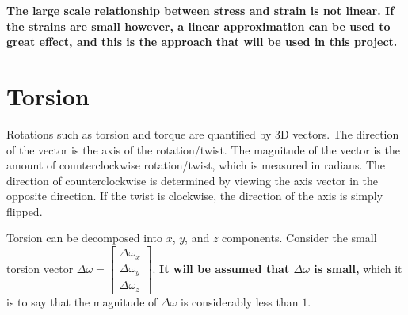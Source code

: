 \documentclass{article}
\begin{document}
{\bf The large scale relationship between stress and strain is not linear. If the strains are small however, a linear approximation can be used to great effect, and this is the approach that will be used in this project.}



\section{Torsion}

Rotations such as torsion and torque are quantified by 3D vectors. The direction of the vector is the axis of the rotation/twist. The magnitude of the vector is the amount of counterclockwise rotation/twist, which is measured in radians. The direction of counterclockwise is determined by viewing the axis vector in the opposite direction. If the twist is clockwise, the direction of the axis is simply flipped. 

Torsion can be decomposed into \(x\), \(y\), and \(z\) components. Consider the small torsion vector \(\Delta\omega = \begin{bmatrix} \Delta\omega_x \\ \Delta\omega_y \\ \Delta\omega_z \end{bmatrix}\). {\bf It will be assumed that \(\Delta\omega\) is small,} which it is to say that the magnitude of \(\Delta\omega\) is considerably less than \(1\). 
\end{document}
